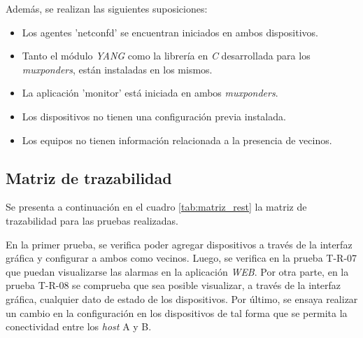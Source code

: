  Además, se realizan las siguientes suposiciones:

\begin{itemize}
	\item Los agentes 'netconfd' se encuentran iniciados en ambos dispositivos.
    \item Tanto el módulo \textit{YANG} como la librería en \textit{C} desarrollada para los \textit{muxponders}, están instaladas en los mismos.
    \item La aplicación 'monitor' está iniciada en ambos \textit{muxponders}.
    \item Los dispositivos no tienen una configuración previa instalada. 
    \item Los equipos no tienen información relacionada a la presencia de vecinos.
\end{itemize}


\subsection{Matriz de trazabilidad}

Se presenta a continuación en el cuadro \ref{tab:matriz_rest} la matriz de trazabilidad para las pruebas realizadas. 

En la primer prueba, se verifica poder agregar dispositivos a través de la interfaz gráfica y configurar a ambos como vecinos. 
Luego, se verifica en la prueba T-R-07 que puedan visualizarse las alarmas en la aplicación \textit{WEB}.
Por otra parte, en la prueba T-R-08 se comprueba que sea posible visualizar, a través de la interfaz gráfica, cualquier dato de estado de los dispositivos.
Por último, se ensaya realizar un cambio en la configuración en los dispositivos de tal forma que se permita la conectividad entre los \textit{host} A y B.
\\



